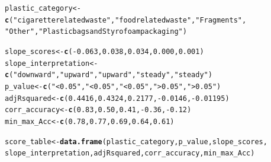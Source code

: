 \documentclass[10pt]{article}\usepackage[]{graphicx}\usepackage[]{color}
\makeatletter
\newcommand{\hlnum}[1]{\textcolor[rgb]{0.686,0.059,0.569}{#1}}%
\newcommand{\hlstr}[1]{\textcolor[rgb]{0.192,0.494,0.8}{#1}}%
\newcommand{\hlopt}[1]{\textcolor[rgb]{0,0,0}{#1}}%
\newcommand{\hlstd}[1]{\textcolor[rgb]{0.345,0.345,0.345}{#1}}%
\newcommand{\hlkwb}[1]{\textcolor[rgb]{0.69,0.353,0.396}{#1}}%
\newcommand{\hlkwd}[1]{\textcolor[rgb]{0.737,0.353,0.396}{\textbf{#1}}}%
\newenvironment{kframe}{%
 \def\at@end@of@kframe{}%
 \ifinner\ifhmode%
  \def\at@end@of@kframe{\end{minipage}}%
  \begin{minipage}{\columnwidth}%
 \fi\fi%
 \def\FrameCommand##1{\hskip\@totalleftmargin \hskip-\fboxsep
 \colorbox{shadecolor}{##1}\hskip-\fboxsep
     \hskip-\linewidth \hskip-\@totalleftmargin \hskip\columnwidth}%
 \MakeFramed {\advance\hsize-\width
   \@totalleftmargin\z@ \linewidth\hsize
   \@setminipage}}%
 {\par\unskip\endMakeFramed%
 \at@end@of@kframe}
\newenvironment{knitrout}{}{} %
\makeatother
\begin{document}
\begin{knitrout}\small
{}\color{fgcolor}\begin{kframe}
\begin{alltt}
\hlstd{plastic_category} \hlkwb{<-}\hlkwd{c}\hlstd{(}\hlstr{"cigarette related waste"}\hlstd{,} \hlstr{"food related waste"}\hlstd{,}\hlstr{"Fragments"}\hlstd{,}
                      \hlstr{"Other"}\hlstd{,}\hlstr{"Plastic bags and Styrofoam packaging"} \hlstd{)}

\hlstd{slope_scores} \hlkwb{<-} \hlkwd{c}\hlstd{(}\hlopt{-}\hlnum{0.063}\hlstd{,}\hlnum{0.038}\hlstd{,} \hlnum{0.034}\hlstd{,} \hlnum{0.000}\hlstd{,} \hlnum{0.001}\hlstd{)}
\hlstd{slope_interpretation} \hlkwb{<-}\hlkwd{c}\hlstd{(}\hlstr{"downward"}\hlstd{,} \hlstr{"upward"}\hlstd{,} \hlstr{"upward"}\hlstd{,} \hlstr{"steady"}\hlstd{,} \hlstr{"steady"}\hlstd{)}
\hlstd{p_value}\hlkwb{<-}\hlkwd{c}\hlstd{(}\hlstr{"<0.05"}\hlstd{,}\hlstr{"<0.05"}\hlstd{,}\hlstr{"<0.05"}\hlstd{,} \hlstr{">0.05"}\hlstd{,}\hlstr{">0.05"}\hlstd{)}
\hlstd{adjRsquared} \hlkwb{<-} \hlkwd{c}\hlstd{(}\hlnum{0.4416}\hlstd{,} \hlnum{0.4324}\hlstd{,} \hlnum{0.2177}\hlstd{,}  \hlopt{-}\hlnum{0.0146}\hlstd{,} \hlopt{-}\hlnum{0.01195}\hlstd{)}
\hlstd{corr_accuracy}\hlkwb{<-}\hlkwd{c}\hlstd{(}\hlnum{0.83}\hlstd{,} \hlnum{0.50}\hlstd{,} \hlnum{0.41}\hlstd{,} \hlopt{-}\hlnum{0.36}\hlstd{,}\hlopt{-}\hlnum{0.12}\hlstd{)}
\hlstd{min_max_Acc}\hlkwb{<-}\hlkwd{c}\hlstd{(}\hlnum{0.78}\hlstd{,}\hlnum{0.77}\hlstd{,}\hlnum{0.69}\hlstd{,} \hlnum{0.64} \hlstd{,}\hlnum{0.61}\hlstd{)}

\hlstd{score_table} \hlkwb{<-} \hlkwd{data.frame}\hlstd{(plastic_category, p_value,slope_scores,}
                          \hlstd{slope_interpretation, adjRsquared, corr_accuracy,min_max_Acc)}
\end{alltt}
\end{kframe}
\end{knitrout}
\end{document}
